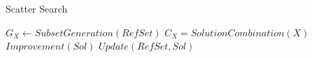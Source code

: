 \begin{algorithm}
  \caption{Scatter Search} \label{alg:SSPhase}
  \begin{algorithmic}
    \Repeat
    \State $G_X \gets SubsetGeneration(RefSet)$
    \State $C_X = SolutionCombination(X)$
    \State $Improvement(Sol)$
    \State $Update(RefSet,Sol)$
    \EndFor
    \EndFor
    \EndProcedure
  \end{algorithmic}
\end{algorithm}
